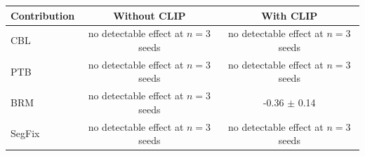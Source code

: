 \begin{tabular}{lcc}
\toprule
Contribution & Without CLIP & With CLIP \\
\midrule
CBL & no detectable effect at $n{=}3$ seeds & no detectable effect at $n{=}3$ seeds \\
PTB & no detectable effect at $n{=}3$ seeds & no detectable effect at $n{=}3$ seeds \\
BRM & no detectable effect at $n{=}3$ seeds & -0.36 $\pm$ 0.14 \\
SegFix & no detectable effect at $n{=}3$ seeds & no detectable effect at $n{=}3$ seeds \\
\bottomrule
\end{tabular}

